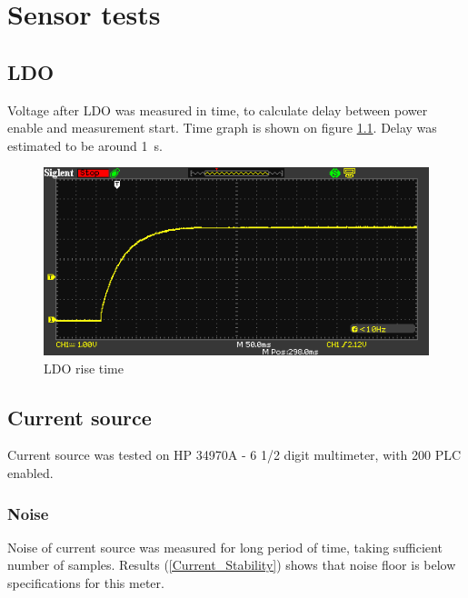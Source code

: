 \chapter{Sensor tests}


\section{LDO}
    Voltage after LDO was measured in time, to calculate delay between power enable and measurement start. Time graph is shown on figure \ref{LDO_rise_time}. Delay was estimated to be around \SI{1}{\second}.

    \begin{figure}[H]
        \centering
        \includegraphics[width=0.8\paperwidth]{img/07/rise_time.png}
        \caption{LDO rise time}
        \label{LDO_rise_time}
    \end{figure}

\section{Current source}
    Current source was tested on HP 34970A - 6 1/2 digit multimeter, with 200 PLC enabled.

    \subsection{Noise}
        Noise of current source was measured for long period of time, taking sufficient number of samples. Results (\ref{Current_Stability}) shows that noise floor is below specifications for this meter.

